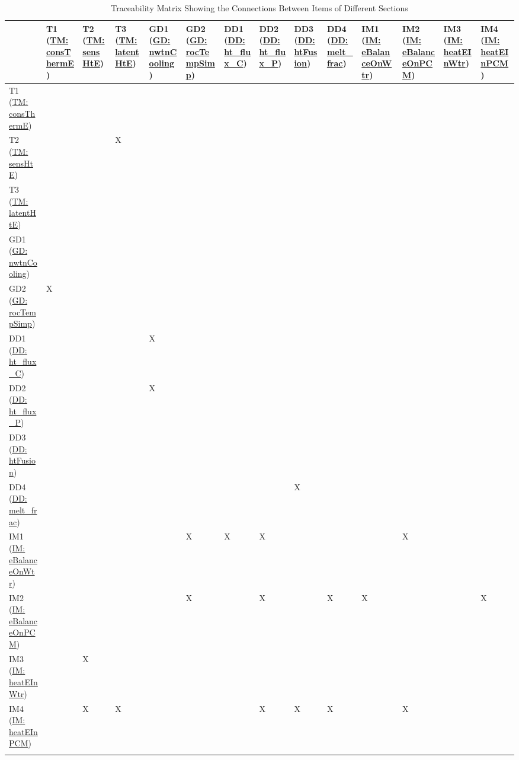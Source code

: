 \documentclass[12pt]{article}
\begin{document}
\begin{longtable}{l l l l l l l l l l l l l l}
\toprule
 & T1 (\hyperref[T:consThermE]{TM: consThermE}) & T2 (\hyperref[T:sensHtE]{TM: sensHtE}) & T3 (\hyperref[T:latentHtE]{TM: latentHtE}) & GD1 (\hyperref[GD:nwtnCooling]{GD: nwtnCooling}) & GD2 (\hyperref[GD:rocTempSimp]{GD: rocTempSimp}) & DD1 (\hyperref[DD:ht.flux.C]{DD: ht\_flux\_C}) & DD2 (\hyperref[DD:ht.flux.P]{DD: ht\_flux\_P}) & DD3 (\hyperref[DD:htFusion]{DD: htFusion}) & DD4 (\hyperref[DD:melt.frac]{DD: melt\_frac}) & IM1 (\hyperref[IM:eBalanceOnWtr]{IM: eBalanceOnWtr}) & IM2 (\hyperref[IM:eBalanceOnPCM]{IM: eBalanceOnPCM}) & IM3 (\hyperref[IM:heatEInWtr]{IM: heatEInWtr}) & IM4 (\hyperref[IM:heatEInPCM]{IM: heatEInPCM})
\\
\midrule
T1 (\hyperref[T:consThermE]{TM: consThermE}) &  &  &  &  &  &  &  &  &  &  &  &  & 
\\
T2 (\hyperref[T:sensHtE]{TM: sensHtE}) &  &  & X &  &  &  &  &  &  &  &  &  & 
\\
T3 (\hyperref[T:latentHtE]{TM: latentHtE}) &  &  &  &  &  &  &  &  &  &  &  &  & 
\\
GD1 (\hyperref[GD:nwtnCooling]{GD: nwtnCooling}) &  &  &  &  &  &  &  &  &  &  &  &  & 
\\
GD2 (\hyperref[GD:rocTempSimp]{GD: rocTempSimp}) & X &  &  &  &  &  &  &  &  &  &  &  & 
\\
DD1 (\hyperref[DD:ht.flux.C]{DD: ht\_flux\_C}) &  &  &  & X &  &  &  &  &  &  &  &  & 
\\
DD2 (\hyperref[DD:ht.flux.P]{DD: ht\_flux\_P}) &  &  &  & X &  &  &  &  &  &  &  &  & 
\\
DD3 (\hyperref[DD:htFusion]{DD: htFusion}) &  &  &  &  &  &  &  &  &  &  &  &  & 
\\
DD4 (\hyperref[DD:melt.frac]{DD: melt\_frac}) &  &  &  &  &  &  &  & X &  &  &  &  & 
\\
IM1 (\hyperref[IM:eBalanceOnWtr]{IM: eBalanceOnWtr}) &  &  &  &  & X & X & X &  &  &  & X &  & 
\\
IM2 (\hyperref[IM:eBalanceOnPCM]{IM: eBalanceOnPCM}) &  &  &  &  & X &  & X &  & X & X &  &  & X
\\
IM3 (\hyperref[IM:heatEInWtr]{IM: heatEInWtr}) &  & X &  &  &  &  &  &  &  &  &  &  & 
\\
IM4 (\hyperref[IM:heatEInPCM]{IM: heatEInPCM}) &  & X & X &  &  &  & X & X & X &  & X &  & 
\\
\bottomrule
\caption{Traceability Matrix Showing the Connections Between Items of Different Sections}
\label{Table:Tracey2}
\end{longtable}
\end{document}
